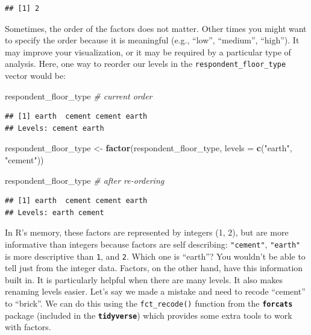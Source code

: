 \documentclass[
]{article}
\newenvironment{Shaded}{\begin{snugshade}}{\end{snugshade}}
\newcommand{\AttributeTok}[1]{\textcolor[rgb]{0.13,0.29,0.53}{#1}}
\newcommand{\CommentTok}[1]{\textcolor[rgb]{0.56,0.35,0.01}{\textit{#1}}}
\newcommand{\FunctionTok}[1]{\textcolor[rgb]{0.13,0.29,0.53}{\textbf{#1}}}
\newcommand{\NormalTok}[1]{#1}
\newcommand{\OtherTok}[1]{\textcolor[rgb]{0.56,0.35,0.01}{#1}}
\newcommand{\StringTok}[1]{\textcolor[rgb]{0.31,0.60,0.02}{#1}}
\begin{document}
\begin{verbatim}
## [1] 2
\end{verbatim}

Sometimes, the order of the factors does not matter. Other times you
might want to specify the order because it is meaningful (e.g., ``low'',
``medium'', ``high''). It may improve your visualization, or it may be
required by a particular type of analysis. Here, one way to reorder our
levels in the \texttt{respondent\_floor\_type} vector would be:

\begin{Shaded}
\begin{Highlighting}[]
\NormalTok{respondent\_floor\_type }\CommentTok{\# current order}
\end{Highlighting}
\end{Shaded}

\begin{verbatim}
## [1] earth  cement cement earth 
## Levels: cement earth
\end{verbatim}

\begin{Shaded}
\begin{Highlighting}[]
\NormalTok{respondent\_floor\_type }\OtherTok{\textless{}{-}} \FunctionTok{factor}\NormalTok{(respondent\_floor\_type, }
                                \AttributeTok{levels =} \FunctionTok{c}\NormalTok{(}\StringTok{"earth"}\NormalTok{, }\StringTok{"cement"}\NormalTok{))}

\NormalTok{respondent\_floor\_type }\CommentTok{\# after re{-}ordering}
\end{Highlighting}
\end{Shaded}

\begin{verbatim}
## [1] earth  cement cement earth 
## Levels: earth cement
\end{verbatim}

In R's memory, these factors are represented by integers (1, 2), but are
more informative than integers because factors are self describing:
\texttt{"cement"}, \texttt{"earth"} is more descriptive than \texttt{1},
and \texttt{2}. Which one is ``earth''? You wouldn't be able to tell
just from the integer data. Factors, on the other hand, have this
information built in. It is particularly helpful when there are many
levels. It also makes renaming levels easier. Let's say we made a
mistake and need to recode ``cement'' to ``brick''. We can do this using
the \texttt{fct\_recode()} function from the \textbf{\texttt{forcats}}
package (included in the \textbf{\texttt{tidyverse}}) which provides
some extra tools to work with factors.
\end{document}
